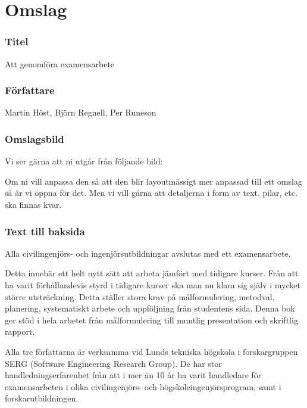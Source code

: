 \section{Omslag}\label{omslag}

\subsubsection{Titel}\label{titel}

Att genomföra examensarbete

\subsubsection{Författare}\label{fuxf6rfattare}

Martin Höst, Björn Regnell, Per Runeson

\subsubsection{Omslagsbild}\label{omslagsbild}

Vi ser gärna att ni utgår från följande bild:

Om ni vill anpassa den så att den blir layoutmässigt mer anpassad till
ett omslag så är vi öppna för det. Men vi vill gärna att detaljerna i
form av text, pilar, etc. ska finnas kvar.

\subsubsection{Text till baksida}\label{text-till-baksida}

Alla civilingenjörs- och ingenjörsutbildningar avslutas med ett
examensarbete.

Detta innebär ett helt nytt sätt att arbeta jämfört med tidigare kurser.
Från att ha varit förhållandevis styrd i tidigare kurser ska man nu
klara sig själv i mycket större utsträckning. Detta ställer stora krav
på målformulering, metodval, planering, systematiskt arbete och
uppföljning från studentens sida. Denna bok ger stöd i hela arbetet från
målformulering till muntlig presentation och skriftlig rapport.

Alla tre författarna är verksamma vid Lunds tekniska högskola i
forskargruppen SERG (Software Engineering Research Group). De har stor
handledningserfarenhet från att i mer än 10 år ha varit handledare för
examensarbeten i olika civilingenjörs- och högskoleingenjörsprogram,
samt i forskarutbildningen.

